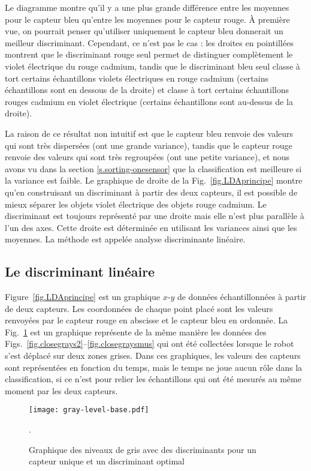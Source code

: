 Le diagramme montre qu'il y a une plus grande différence entre les moyennes pour le capteur bleu qu'entre les moyennes pour le capteur rouge. À première vue, on pourrait penser qu'utiliser uniquement le capteur bleu donnerait un meilleur discriminant. Cependant, ce n'est pas le cas : les droites en pointillées montrent que le discriminant rouge seul permet de distinguer complètement le violet électrique du rouge cadmium, tandis que le discriminant bleu seul classe à tort certains échantillons violets électriques en rouge cadmium (certains échantillons sont en dessous de la droite) et classe à tort certains échantillons rouges cadmium en violet électrique (certains échantillons sont au-dessus de la droite).

La raison de ce résultat non intuitif est que le capteur bleu renvoie des valeurs qui sont très dispersées (ont une grande variance), tandis que le capteur rouge renvoie des valeurs qui sont très regroupées (ont une petite variance), et nous avons vu dans la section \ref{s.sorting-onesensor} que la classification est meilleure si la variance est faible. Le graphique de droite de la Fig.~\ref{fig.LDAprincipe} montre qu'en construisant un discriminant à partir des deux capteurs, il est possible de mieux séparer les objets violet électrique des objets rouge cadmium. Le discriminant est toujours représenté par une droite mais elle n’est plus parallèle à l’un des axes. Cette droite est déterminée en utilisant les variances ainsi que les moyennes. La méthode est appelée analyse discriminante linéaire.

\subsection{Le discriminant linéaire}

Figure~\ref{fig.LDAprincipe} est un graphique $x$-$y$ de données échantillonnées à partir de deux capteurs. Les coordonnées de chaque point placé sont les valeurs renvoyées par le capteur rouge en abscisse et le capteur bleu en ordonnée. La Fig.~\ref{fig.gray-x-y} est un graphique représente de la même manière les données des Figs.~\ref{fig.closegrays2}--\ref{fig.closegraysmus} qui ont été collectées lorsque le robot s'est déplacé sur deux zones grises.  Dans ces graphiques, les valeurs des capteurs sont représentées en fonction du temps, mais le temps ne joue aucun rôle dans la classification, si ce n'est pour relier les échantillons qui ont été mesurés au même moment par les deux capteurs.

\begin{figure}
\begin{center}
\texttt{[image: gray-level-base.pdf]}
\end{center}
\caption{Graphique des niveaux de gris avec des discriminants pour un capteur unique et un discriminant optimal}
\label{fig.gray-x-y}.
\end{figure}

